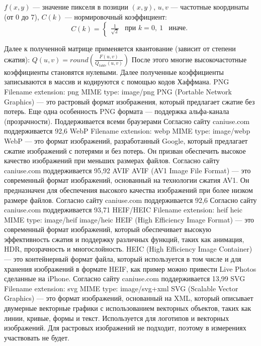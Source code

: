 \documentclass[12pt]{article}
\begin{document}
$f(x,y)$ — значение пикселя в позиции $(x,y)$,
$u,v$ — частотные координаты (от 0 до 7),
$C(k)$ — нормировочный коэффициент:
    $$
        C(k) = \begin{cases}
            \frac{1}{\sqrt{2}} & \text{при } k=0, \
            1                  & \text{иначе}.
        \end{cases}
    $$

    Далее к полученной матрице применяется квантование (зависит от степени сжатия):
$
Q(u, v) = round(\frac{F(u, v)}{Q_{table}(u, v)})
$
    После этого многие высокочастотные коэффициенты становятся нулевыми.
    Далее полученные коэффициенты записываются в массив и кодируются с помощью кодов Хаффмана.
    PNG
    Filename extension: png
    MIME type: image/png
    PNG (Portable Network Graphics) — это растровый формат изображения, который предлагает сжатие без потерь. Еще одна особенность PNG формата — поддержка альфа-канала (прозрачности). Поддерживается всеми браузерами
    Согласно сайту caniuse.com поддерживается 92,6%
    WebP
    Filename extension: webp
    MIME type: image/webp
    WebP — это формат изображений, разработанный Google, который предлагает сжатие изображений с потерями и без потерь. Он призван обеспечить высокое качество изображений при меньших размерах файлов.
    Согласно сайту caniuse.com поддерживается 95,92%
    AVIF
    AVIF (AV1 Image File Format) — это современный формат изображений, основанный на технологии сжатия AV1. Он предназначен для обеспечения высокого качества изображений при более низком размере файлов. Согласно сайту caniuse.com поддерживается 92,6%
    Согласно сайту caniuse.com поддерживается 93,71%
    HEIF/HEIC
    Filename extension: heif heic
    MIME type: image/heif image/heic
    HEIF (High Efficiency Image Format) — это современный формат изображений, который обеспечивает высокую эффективность сжатия и поддержку различных функций, таких как анимация, HDR, прозрачность и многослойность.
    HEIC (High Efficiency Image Container) — это контейнерный формат файла, который используется в том числе и для хранения изображений в формате HEIF, как пример можно привести Live Photos сделанные на iPhone.
    Согласно сайту caniuse.com поддерживается 13,99%
    SVG
    Filename extension: svg
    MIME type: image/svg+xml
    SVG (Scalable Vector Graphics) — это формат изображений, основанный на XML, который описывает двумерные векторные графики с использованием векторных объектов, таких как линии, кривые, формы и текст. Используется для логотипов и векторных изображений. Для растровых изображений не подходит, поэтому в измерениях участвовать не будет.
\end{document}
